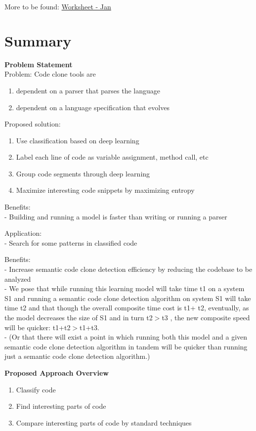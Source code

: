 \documentclass{article}
\begin{document}
    More to be found: \href{https://github.com/johnsimmons2/heuristic-dl/wiki/Worksheet:-Jan}{Worksheet - Jan}





    \section{Summary}
    \textbf{Problem Statement}\\
    Problem: Code clone tools are
    \begin{enumerate}
        \item dependent on a parser that parses the language
        \item dependent on a language specification that evolves
    \end{enumerate}
    Proposed solution:
    \begin{enumerate}
        \item Use classification based on deep learning
        \item Label each line of code as variable assignment, method call, etc
        \item Group code segments through deep learning
        \item Maximize interesting code snippets by maximizing entropy
    \end{enumerate}
    Benefits:\\
    - Building and running a model is faster than writing or running a parser

    Application:\\
    - Search for some patterns in classified code

    Benefits:\\
    - Increase semantic code clone detection efficiency by reducing the codebase to be analyzed \\
    - We pose that while running this learning model will take time t1 on a system S1 and running a semantic code clone detection algorithm on system S1 will take time t2 and that though the overall composite time cost is t1+ t2, eventually, as the model decreases the size of S1 and in turn t2$>$t3 , the new composite speed will be quicker: t1+t2$>$t1+t3.\\
    - (Or that there will exist a point in which running both this model and a given semantic code clone detection algorithm in tandem will be quicker than running just a semantic code clone detection algorithm.)

    \textbf{Proposed Approach Overview}
    \begin{enumerate}
        \item Classify code
        \item Find interesting parts of code
        \item Compare interesting parts of code by standard techniques
    \end{enumerate}
\end{document}

